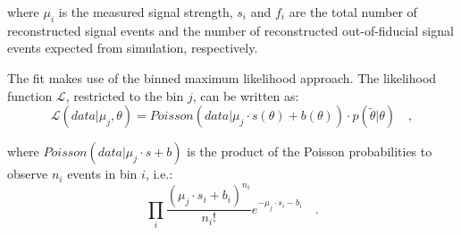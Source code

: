 \noindent where $\mu_i$ is the measured signal strength, $s_i$ and $f_i$ are the total number of reconstructed signal events and the number of reconstructed out-of-fiducial signal events expected from simulation, respectively.

The fit makes use of the binned maximum likelihood approach. The likelihood function $\mathcal{L}$, restricted to the \pth bin $j$, can be written as:
\begin{equation}
\mathcal{L}(data|\mu_j,\theta) = Poisson(data|\mu_j \cdot s(\theta) + b(\theta)) \cdot p(\tilde{\theta} |\theta ) \quad ,
\end{equation}

\noindent where $Poisson(data|\mu_j \cdot s + b)$ is the product of the Poisson probabilities to observe $n_i$ events in bin $i$, i.e.:
\begin{equation}\label{eq:poisson}
\prod_i \frac{(\mu_j\cdot s_i + b_i)^{n_i}}{n_i !} e^{-\mu_j \cdot s_i - b_i} \quad.
\end{equation}

